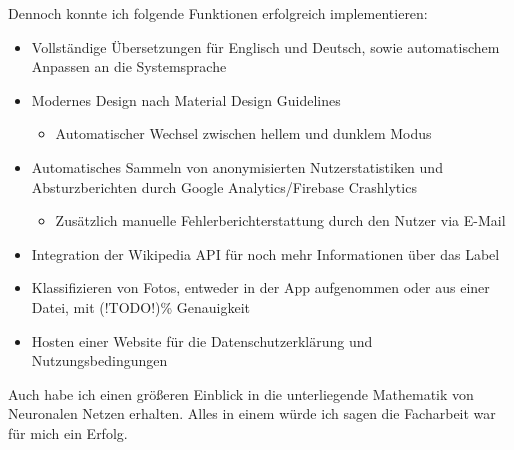 Dennoch konnte ich folgende Funktionen erfolgreich implementieren:

\begin{itemize}
  \item Vollständige Übersetzungen für Englisch und Deutsch, sowie automatischem Anpassen an die Systemsprache
  \item Modernes Design nach Material Design Guidelines
        \begin{itemize}
          \item Automatischer Wechsel zwischen hellem und dunklem Modus
        \end{itemize}
  \item Automatisches Sammeln von anonymisierten Nutzerstatistiken und Absturzberichten durch Google Analytics/Firebase Crashlytics
        \begin{itemize}
          \item Zusätzlich manuelle Fehlerberichterstattung durch den Nutzer via E-Mail
        \end{itemize}
  \item Integration der Wikipedia API für noch mehr Informationen über das Label
  \item Klassifizieren von Fotos, entweder in der App aufgenommen oder aus einer Datei, mit (!TODO!)\% Genauigkeit
  \item Hosten einer Website für die Datenschutzerklärung und Nutzungsbedingungen
\end{itemize}

Auch habe ich einen größeren Einblick in die unterliegende Mathematik von Neuronalen Netzen erhalten. Alles in einem würde ich sagen die Facharbeit war für mich ein Erfolg.